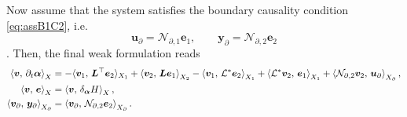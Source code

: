 Now assume that the system satisfies the boundary causality condition \eqref{eq:assB1C2}, i.e.  
\begin{equation*}
\bm{u}_\partial=\mathcal{N}_{\partial, 1} \bm{e}_1, \qquad \bm{y}_\partial=\mathcal{N}_{\partial, 2} \bm{e}_2
\end{equation*}. 
Then, the final weak formulation reads
\begin{equation}\label{eq:weak_sys_intJ2}
\begin{aligned}
\inner[X]{\bm{v}}{\partial_t \bm{\alpha}} &=   -  \langle{\bm{v}_1}, \,{\bm{L}^\top \bm{e}_2}\rangle_{X_1} + \inner[X_2]{\bm{v}_2}{\bm{L}\bm{e}_1} -\inner[X_1]{\bm{v}_1}{\mathcal{L}^*\bm{e}_2} + \inner[X_1]{\mathcal{L}^*\bm{v}_2}{\bm{e}_1} + \inner[X_\partial]{\mathcal{N}_{\partial, 2} \bm{v}_2}{\bm{u}_{\partial}}, \\
\inner[X]{\bm{v}}{\bm{e}}&= \inner[X]{\bm{v}}{\delta_{\bm{\alpha}} H}, \\
\inner[X_\partial]{\bm{v}_\partial}{\bm{y}_\partial} &= \inner[X_\partial]{\bm{v}_\partial}{\mathcal{N}_{\partial, 2}\bm{e}_2}.
\end{aligned}
\end{equation}

